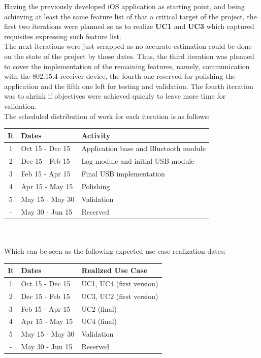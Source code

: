 			Having the previously developed iOS application as starting point, and being achieving at least the same feature list of that a critical target of the project, the first two iterations were planned so as to realize \textbf{UC1} and \textbf{UC3} which captured requisites expressing such feature list.\\

			The next iterations were just scrapped as no accurate estimation could be done on the state of the project by those dates. Thus, the third iteration was planned to cover the implementation of the remaining features, namely, communication with the 802.15.4 receiver device, the fourth one reserved for polishing the application and the fifth one left for testing and validation. The fourth iteration was to shrink if objectives were achieved quickly to leave more time for validation.\\

			The scheduled distribution of work for each iteration is as follows:\\

			\begin{tabular}{| c | l | l |} %
				\hline
				It & Dates & Activity \\ \hline
				1 & Oct 15 - Dec 15 & Application base and Bluetooth module\\ \hline
				2 & Dec 15 - Feb 15 & Log module and initial USB module\\ \hline
				3 & Feb 15 - Apr 15 & Final USB implementation \\ \hline
				4 & Apr 15 - May 15 & Polishing \\ \hline
				5 & May 15 - May 30 & Validation \\ \hline
				- & May 30 - Jun 15 & Reserved \\
				\hline
			\end{tabular}\\\\

			Which can be seen as the following expected use case realization dates:\\

			\begin{tabular}{| c | l | l |} %
				\hline
				It & Dates & Realized Use Case \\ \hline
				1 & Oct 15 - Dec 15 & UC1, UC4 (first version)\\ \hline
				2 & Dec 15 - Feb 15 & UC3, UC2 (first version)\\ \hline
				3 & Feb 15 - Apr 15 & UC2 (final) \\ \hline
				4 & Apr 15 - May 15 & UC4 (final) \\ \hline
				5 & May 15 - May 30 & Validation \\ \hline
				- & May 30 - Jun 15 & Reserved \\
				\hline
			\end{tabular}\\\\

